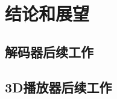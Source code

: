 

\chapter{结论和展望}
\label{cha:conclusionandforesight}



\section{解码器后续工作}
\label{sec:decoderfuturework}



\section{3D播放器后续工作}
\label{sec:3dplayerfuturework}


